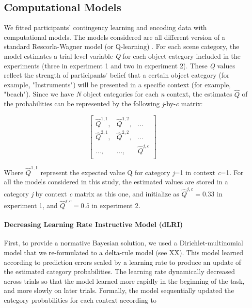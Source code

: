 \documentclass[a4paper,12pt]{article}
\begin{document}
\subsection{Computational Models}
We fitted participants' contingency learning and encoding data with computational models. The models considered are all different version of a standard Rescorla-Wagner model (or Q-learning) \citep{Sutton1998, Daw2011}. For each scene category, the model estimates a trial-level variable \textit{Q} for each object category included in the experiments (three in experiment 1 and two in experiment 2). These \textit{Q} values reflect the strength of participants' belief that a certain object category (for example, "Instruments") will be presented in a specific context (for example, "beach"). 
\noindent
Since we have \textit{N} object categories for each \textit{n} context, the estimates $\hat{Q}$ of the probabilities can be represented by the following \textit{j}-by-\textit{c} matrix:

\begin{equation}
\begin{bmatrix} 
\hat{Q}^{1,1}, & \hat{Q}^{1,2}, & ... \\
\hat{Q}^{2,1}, & \hat{Q}^{2,2}, & ...\\
..., &..., & \hat{Q}^{j,c} \\
\end{bmatrix}
\quad
\label{matrix}
\end{equation}

\noindent
Where $\hat{Q}^{1,1}$ represent the expected value Q for category \textit{j}=1 in context \textit{c}=1. For all the models considered in this study, the estimated values are stored in a category \textit{j} by context \textit{c} matrix as this one, and initialize as  $\hat{Q}^{j,c} = 0.33$ in experiment 1, and $\hat{Q}^{j,c} = 0.5$ in experiment 2.

\paragraph{Decreasing Learning Rate Instructive Model (dLRI)} First, to provide a normative Bayesian solution, we used a Dirichlet-multinomial model that we re-formulated to a delta-rule model (see XX). This model learned according to prediction errors scaled by a learning rate to produce an update of the estimated category probabilities. The learning rate dynamically decreased across trials so that the model learned more rapidly in the beginning of the task, and more slowly on later trials.  Formally, the model sequentially updated the category probabilities for each context according to
\end{document}
